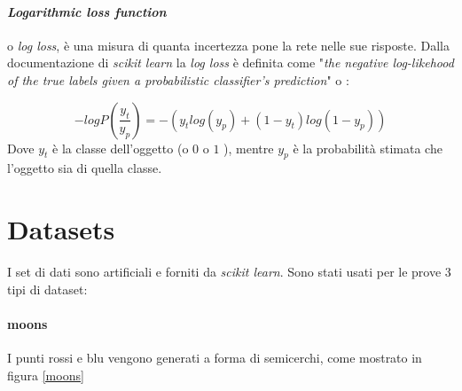 \documentclass[12pt,a4paper]{report}
\begin{document}
\paragraph{\textit{Logarithmic loss function}} o \textit{log loss}, è una misura di quanta incertezza pone la rete nelle sue risposte. Dalla documentazione di \textit{scikit learn} la \textit{log loss} è definita come "\textit{the negative log-likehood of the true labels given a probabilistic classifier's prediction}" o :  

\begin{equation}
 -log P(\frac{y_{t}}{y_{p}}) = -(y_{t} log(y_{p}) + (1 - y_{t}) log(1 - y_{p}))
\end{equation}
Dove $y_{t}$ è la classe dell'oggetto (o $0$ o $1$ ), mentre $y_{p}$ è la probabilità stimata che l'oggetto sia di quella classe.

\section{Datasets}

I set di dati sono artificiali e forniti da \textit{scikit learn}. 
Sono stati usati per le prove 3 tipi di dataset:

\paragraph{moons} I punti rossi e blu vengono generati a forma di semicerchi, come mostrato in figura \ref{moons} 
\end{document}
